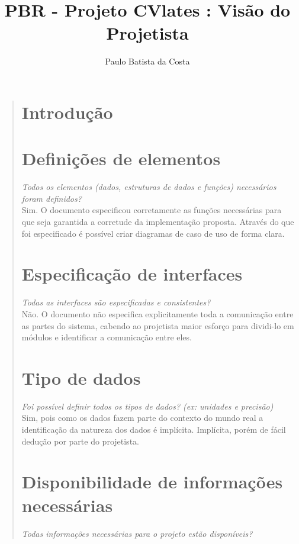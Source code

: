 \documentclass[12pt,a4paper]{report}
\author{Paulo Batista da Costa}
\title{PBR - Projeto CVlates : Visão do Projetista}
\begin{document}
\maketitle
\tableofcontents
\begin{quotation}
\newpage
\section{Introdução}
\section{Definições de elementos}
\textit{Todos os elementos (dados, estruturas de dados e funções) necessários foram definidos?}  \vspace{0.3cm}\\ 

 Sim. O documento especificou corretamente as funções necessárias para que seja garantida a corretude da implementação proposta. Através do que foi especificado é possível criar diagramas de caso de uso de forma clara. 
\section{Especificação de interfaces}
\textit{Todas as interfaces são especificadas e consistentes?} \vspace{0.3cm}\\ 

Não. O documento não especifica explicitamente toda a comunicação entre as partes do sistema, cabendo ao projetista maior esforço para dividi-lo  em módulos e identificar a comunicação entre eles. 
\section{Tipo de dados}
\textit{Foi possível definir todos os tipos de dados? (ex: unidades e precisão)}\vspace{0.3cm}\\ 

Sim, pois como os dados fazem parte do contexto do mundo real a identificação da natureza dos dados é implícita. Implícita, porém de fácil dedução por parte do projetista.
\newpage
\section{Disponibilidade de informações necessárias}
\textit{Todas informações necessárias para o projeto estão disponíveis?}\vspace{0.3cm}\\


\end{quotation}
\end{document}
